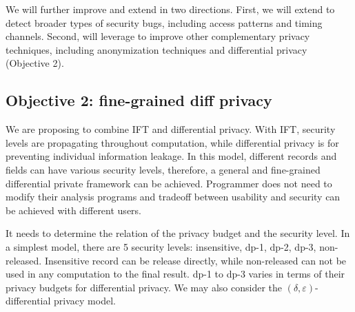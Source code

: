 




 We will further improve and extend \kakute in 
two directions. First, we will extend \kakute to detect broader types of
security bugs, including access patterns and timing channels. Second, will 
leverage \kakute to improve other complementary privacy techniques, including 
anonymization techniques and differential privacy (Objective 2). 

\vspace{-.15in}\subsection{Objective 2: 
fine-grained diff privacy}\label{sec:obj2}\vspace{-.075in}

We are proposing
to combine IFT and differential privacy. With IFT, security levels are 
propagating
throughout computation, while differential privacy is for preventing individual 
information leakage.
In this model, different records and fields can have various security levels,
therefore, a general and fine-grained differential private framework can be 
achieved.
Programmer does not need to modify their analysis programs and tradeoff between
usability and security can be achieved with different users.

It needs to determine the relation of the privacy budget and the security
level.
In a simplest model, there are 5 security levels: insensitive, dp-1,
dp-2, dp-3, non-released. Insensitive record can be release directly,
while non-released can not be used in
any computation to the final result. dp-1 to dp-3 varies in terms of their
privacy budgets for differential privacy.
We may also consider the $(\delta, \varepsilon)$-differential privacy model.

